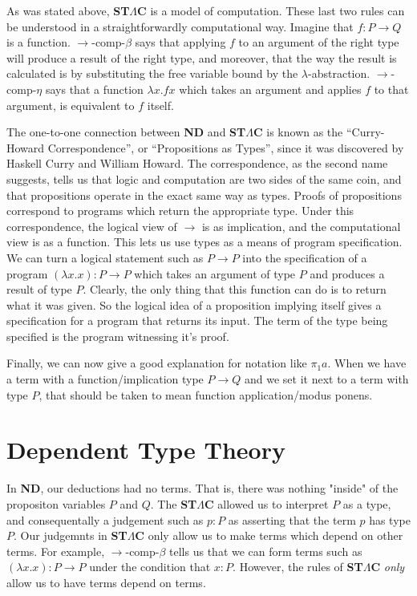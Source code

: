 \documentclass{article}
\begin{document}
As was stated above, \textbf{ST$\Lambda$C} is a model of computation.
These last two rules can be understood in a straightforwardly computational way.
Imagine that $f : P \rightarrow Q$ is a function. $\rightarrow$-comp-$\beta$
says that applying $f$ to an argument of the right type will produce a result
of the right type, and moreover, that the way the result is calculated is by
substituting the free variable bound by the $\lambda$-abstraction.
$\rightarrow$-comp-$\eta$ says that a function $\lambda x . f x$ which 
takes an argument and applies $f$ to that argument, is equivalent to $f$ itself.

The one-to-one connection between \textbf{ND} and \textbf{ST$\Lambda$C} is known as
the ``Curry-Howard Correspondence'', or ``Propositions as Types'', since it was
discovered by Haskell Curry and William Howard. The correspondence, as the second
name suggests, tells us that logic and computation are two sides of the same coin,
and that propositions operate in the exact same way as types. Proofs of propositions
correspond to programs which return the appropriate type. Under this correspondence,
the logical view of $\rightarrow$ is as implication, and the computational view is
as a function. This lets us use types as a means of program specification. We 
can turn a logical statement such as $P \rightarrow P$ into the specification
of a program $(\lambda x. x) : P \rightarrow P$ which takes an argument of type $P$
and produces a result of type $P$. Clearly, the only thing that this function
can do is to return what it was given. So the logical idea of a proposition
implying itself gives a specification for a program that returns its
input. The term of the type being specified is the program witnessing it's
proof.

Finally, we can now give a good explanation for notation like $\pi_1 a$. When
we have a term with a function/implication type $P \rightarrow Q$ and we set
it next to a term with type $P$, that should be taken to mean function 
application/modus ponens.


\section{Dependent Type Theory}

In \textbf{ND}, our deductions had no terms. That is, there was nothing
"inside" of the propositon variables $P$ and $Q$. The \textbf{ST$\Lambda$C} allowed
us to interpret $P$ as a type, and consequentally a judgement such as $p : P$ as 
asserting that the term $p$ has type $P$. Our judgemnts in \textbf{ST$\Lambda$C}
only allow us to make terms which depend on other terms. For example, 
$\rightarrow$-comp-$\beta$ tells us that we can form terms such as 
$(\lambda x. x) : P \rightarrow P$ under the condition that $x : P$. However,
the rules of \textbf{ST$\Lambda$C} \emph{only} allow us to have terms depend
on terms. 
\end{document}
